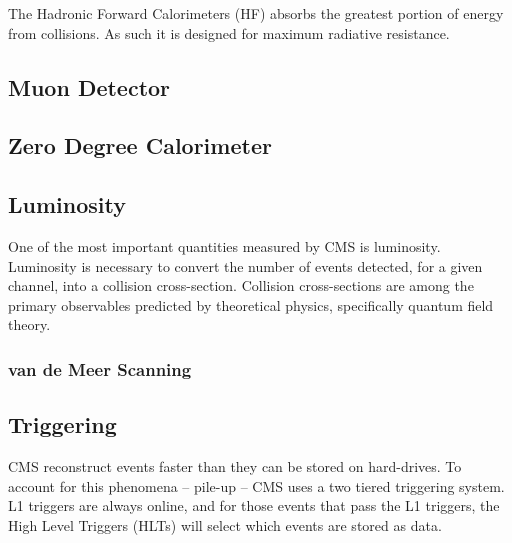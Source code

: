The Hadronic Forward Calorimeters (HF) absorbs the greatest portion of energy from collisions. As such it is designed for maximum radiative resistance.

\subsection{Muon Detector}

\subsection{Zero Degree Calorimeter}

\subsection{Luminosity}

One of the most important quantities measured by CMS is luminosity. Luminosity is necessary to convert the number of events detected, for a given channel, into a collision cross-section. Collision cross-sections are among the primary observables predicted by theoretical physics, specifically quantum field theory.

\subsubsection{van de Meer Scanning}

\subsection{Triggering}

CMS reconstruct events faster than they can be stored on hard-drives. To account for this phenomena -- pile-up -- CMS uses a two tiered triggering system. L1 triggers are always online, and for those events that pass the L1 triggers, the High Level Triggers (HLTs) will select which events are stored as data.